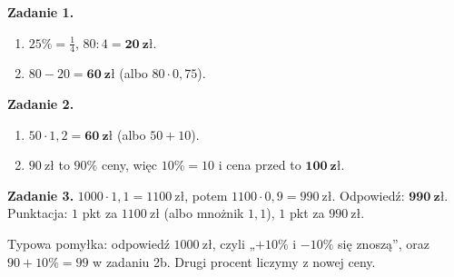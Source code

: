 \documentclass[11pt,a4paper]{article}
\begin{document}

\vspace{0.6em}
\textbf{Zadanie 1.}
\begin{enumerate}[label=\alph*), leftmargin=*, itemsep=4pt]
  \item $25\%=\frac{1}{4}$, $80:4=\mathbf{20\ zł}$.
  \item $80-20=\mathbf{60\ zł}$ (albo $80\cdot 0{,}75$).
\end{enumerate}

\textbf{Zadanie 2.}
\begin{enumerate}[label=\alph*), leftmargin=*, itemsep=4pt]
  \item $50\cdot 1{,}2=\mathbf{60\ zł}$ (albo $50+10$).
  \item $90\ \text{zł}$ to $90\%$ ceny, więc $10\%=10$ i cena przed to $\mathbf{100\ zł}$.
\end{enumerate}

\textbf{Zadanie 3.} $1000\cdot 1{,}1=1100\ \text{zł}$, potem $1100\cdot 0{,}9=990\ \text{zł}$. Odpowiedź: $\mathbf{990\ zł}$. Punktacja: $1$ pkt za $1100\ \text{zł}$ (albo mnożnik $1{,}1$), $1$ pkt za $990\ \text{zł}$.

\vspace{0.6em}
\begin{tcolorbox}[colback=white, colframe=okres, boxrule=0.6pt, arc=2pt, title=Wskazówka dla Pawła]
Typowa pomyłka: odpowiedź $1000\ \text{zł}$, czyli „$+10\%$ i $-10\%$ się znoszą”, oraz $90+10\%=99$ w zadaniu 2b. Drugi procent liczymy z nowej ceny.
\end{tcolorbox}
\end{document}
